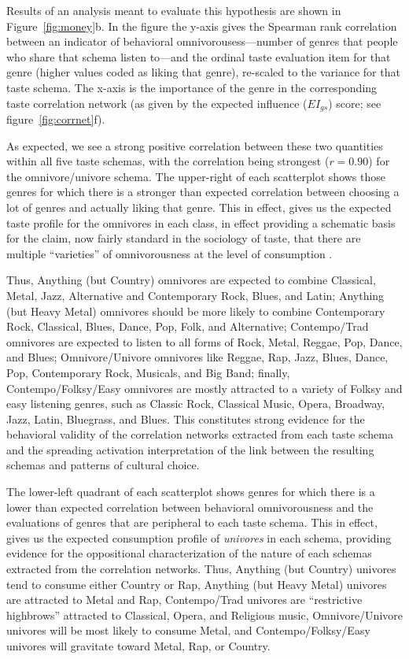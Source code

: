 \documentclass[preprint, authoryear,11pt, 3p]{elsarticle}
\begin{document}
Results of an analysis meant to evaluate this hypothesis are shown in Figure~\ref{fig:money}b. In the figure the y-axis gives the Spearman rank correlation between an indicator of behavioral omnivorousess---number of genres that people who share that schema listen to---and the ordinal taste evaluation item for that genre (higher values coded as liking that genre), re-scaled to the variance for that taste schema. The x-axis is the importance of the genre in the corresponding taste correlation network (as given by the expected influence ($EI_{gs}$) score; see figure~\ref{fig:corrnet}f). 

As expected, we see a strong positive correlation between these two quantities within all five taste schemas, with the correlation being strongest ($r = 0.90$) for the omnivore/univore schema. The upper-right of each scatterplot shows those genres for which there is a stronger than expected correlation between choosing a lot of genres and actually liking that genre. This in effect, gives us the expected taste profile for the omnivores in each class, in effect providing a schematic basis for the claim, now fairly standard in the sociology of taste, that there are multiple ``varieties'' of omnivorousness at the level of consumption \citep{coulangeon2015social, ollivier2008modes, savage2011unravelling}. 

Thus, Anything (but Country) omnivores are expected to combine Classical, Metal, Jazz, Alternative and Contemporary Rock, Blues, and Latin; Anything (but Heavy Metal) omnivores should be more likely to combine Contemporary Rock, Classical, Blues, Dance, Pop, Folk, and Alternative; Contempo/Trad omnivores are expected to listen to all forms of Rock, Metal, Reggae, Pop, Dance, and Blues; Omnivore/Univore omnivores like Reggae, Rap, Jazz, Blues, Dance, Pop, Contemporary Rock, Musicals, and Big Band; finally, Contempo/Folksy/Easy omnivores are mostly attracted to a variety of Folksy and easy listening genres, such as Classic Rock, Classical Music, Opera, Broadway, Jazz, Latin, Bluegrass, and Blues. This constitutes strong evidence for the behavioral validity of the correlation networks extracted from each taste schema and the spreading activation interpretation of the link between the resulting schemas and patterns of cultural choice. 

The lower-left quadrant of each scatterplot shows genres for which there is a lower than expected correlation between behavioral omnivorousness and the evaluations of genres that are peripheral to each taste schema. This in effect, gives us the expected consumption profile of \emph{univores} in each schema, providing evidence for the oppositional characterization of the nature of each schemas extracted from the correlation networks. Thus, Anything (but Country) univores tend to consume either Country or Rap,  Anything (but Heavy Metal) univores are attracted to Metal and Rap, Contempo/Trad univores are ``restrictive highbrows'' attracted to Classical, Opera, and Religious music, Omnivore/Univore univores will be most likely to consume Metal, and Contempo/Folksy/Easy univores will gravitate toward Metal, Rap, or Country. 
\end{document}
